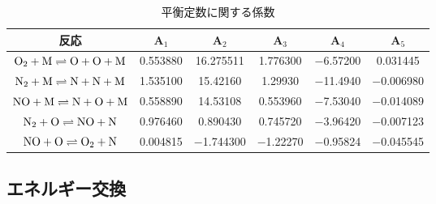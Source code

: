      \begin{table}[!htbp]
      \begin{center}
       \caption{平衡定数に関する係数}
        \begin{tabular}{c c c c c c} \hline \hline
                        反応 & A$_1$ & A$_2$ & A$_3$ & A$_4$ & A$_5$ \\ \hline 
  ${\rm O}_2+{\rm M} \rightleftharpoons {\rm O}+{\rm O}+{\rm M}$ & 0.553880 & 16.275511 & 1.776300 & $-$6.57200 & 0.031445 \\
  ${\rm N}_2+{\rm M} \rightleftharpoons {\rm N}+{\rm N}+{\rm M}$ & 1.535100 & 15.42160  & 1.29930  & $-$11.4940 &$-$0.006980 \\
  ${\rm NO}+{\rm M}  \rightleftharpoons {\rm N}+{\rm O}+{\rm M}$ & 0.558890 & 14.53108  & 0.553960 & $-$7.53040 &$-$0.014089 \\
  ${\rm N}_2+{\rm O} \rightleftharpoons {\rm NO}+{\rm N}$        & 0.976460 & 0.890430  & 0.745720 & $-$3.96420 &$-$0.007123 \\
  ${\rm NO}+{\rm O}  \rightleftharpoons {\rm O}_2+{\rm N}$       & 0.004815 &$-$1.744300  &$-$1.22270  & $-$0.95824 &$-$0.045545 \\
                             \hline \hline
        \end{tabular}
       \label{tab:equcoef}
      \end{center}
     \end{table} 

\subsection*{エネルギー交換}


